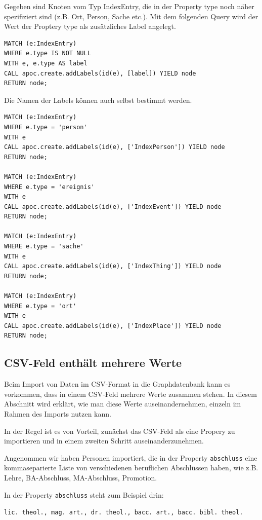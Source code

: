 Gegeben sind Knoten vom Typ IndexEntry, die in der Property type noch
näher spezifiziert sind (z.B. Ort, Person, Sache etc.). Mit dem
folgenden Query wird der Wert der Proptery type als zusätzliches Label
angelegt.

\begin{verbatim}
MATCH (e:IndexEntry)
WHERE e.type IS NOT NULL
WITH e, e.type AS label
CALL apoc.create.addLabels(id(e), [label]) YIELD node
RETURN node;
\end{verbatim}

Die Namen der Labels können auch selbst bestimmt werden.

\begin{verbatim}
MATCH (e:IndexEntry)
WHERE e.type = 'person'
WITH e
CALL apoc.create.addLabels(id(e), ['IndexPerson']) YIELD node
RETURN node;

MATCH (e:IndexEntry)
WHERE e.type = 'ereignis'
WITH e
CALL apoc.create.addLabels(id(e), ['IndexEvent']) YIELD node
RETURN node;

MATCH (e:IndexEntry)
WHERE e.type = 'sache'
WITH e
CALL apoc.create.addLabels(id(e), ['IndexThing']) YIELD node
RETURN node;

MATCH (e:IndexEntry)
WHERE e.type = 'ort'
WITH e
CALL apoc.create.addLabels(id(e), ['IndexPlace']) YIELD node
RETURN node;
\end{verbatim}

\hypertarget{csv-feld-enthuxe4lt-mehrere-werte}{%
\subsection{CSV-Feld enthält mehrere
Werte}\label{csv-feld-enthuxe4lt-mehrere-werte}}

Beim Import von Daten im CSV-Format in die Graphdatenbank kann es
vorkommen, dass in einem CSV-Feld mehrere Werte zusammen stehen. In
diesem Abschnitt wird erklärt, wie man diese Werte auseinandernehmen,
einzeln im Rahmen des Imports nutzen kann.

In der Regel ist es von Vorteil, zunächst das CSV-Feld als eine Propery
zu importieren und in einem zweiten Schritt auseinanderzunehmen.

Angenommen wir haben Personen importiert, die in der Property
\texttt{abschluss} eine kommaseparierte Liste von verschiedenen
beruflichen Abschlüssen haben, wie z.B. Lehre, BA-Abschluss,
MA-Abschluss, Promotion.

In der Property \texttt{abschluss} steht zum Beispiel drin:

\texttt{lic.\ theol.,\ mag.\ art.,\ dr.\ theol.,\ bacc.\ art.,\ bacc.\ bibl.\ theol.}

